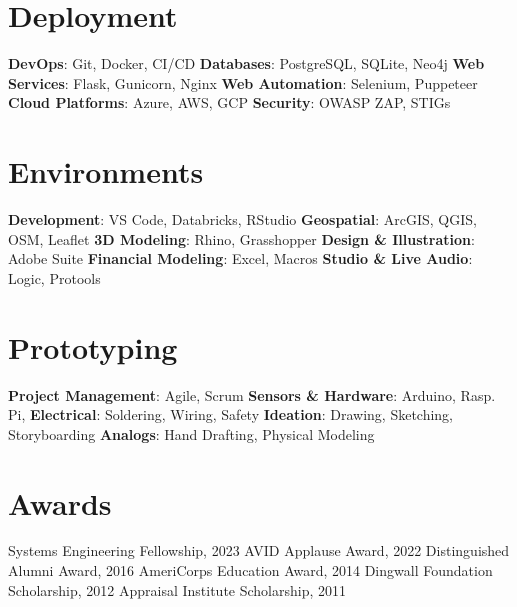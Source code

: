 \documentclass{article}
\begin{document}
\begin{bgbox}[
        height = \paperheight,
        width = 0.3\textwidth,
        colback = gray
    ]
{            \section*{Deployment}
                \textbf{DevOps}: Git, Docker, CI/CD \newline
                \textbf{Databases}: PostgreSQL, SQLite, Neo4j\newline
                \textbf{Web Services}: Flask, Gunicorn, Nginx\newline
                \textbf{Web Automation}: Selenium, Puppeteer\newline
                \textbf{Cloud Platforms}: Azure, AWS, GCP\newline
                \textbf{Security}: OWASP ZAP, STIGs
            \section*{Environments}
                \textbf{Development}: VS Code, Databricks, RStudio\newline
                \textbf{Geospatial}: ArcGIS, QGIS, OSM, Leaflet\newline
                \textbf{3D Modeling}: Rhino, Grasshopper\newline
                \textbf{Design \& Illustration}: Adobe Suite\newline
                \textbf{Financial Modeling}: Excel, Macros\newline
                \textbf{Studio \& Live Audio}: Logic, Protools
            \section*{Prototyping}
                \textbf{Project Management}: Agile, Scrum\newline
                \textbf{Sensors \& Hardware}: Arduino, Rasp. Pi,\newline
                \textbf{Electrical}: Soldering, Wiring, Safety\newline
                \textbf{Ideation}: Drawing, Sketching, Storyboarding\newline
                \textbf{Analogs}: Hand Drafting, Physical Modeling
            \section*{Awards}
                Systems Engineering Fellowship, 2023\newline
                AVID Applause Award, 2022\newline
                Distinguished Alumni Award, 2016\newline
                AmeriCorps Education Award, 2014\newline
                Dingwall Foundation Scholarship, 2012\newline
                Appraisal Institute Scholarship, 2011
        }
    \end{bgbox}
\end{document}

